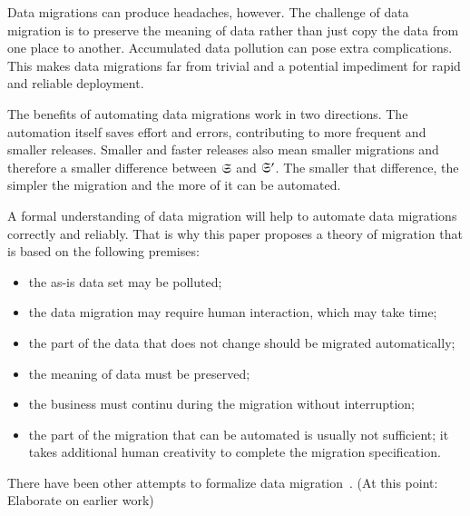 \documentclass{elsarticle}
\begin{document}
	Data migrations can produce headaches, however.
	The challenge of data migration is to preserve the meaning of data
	rather than just copy the data from one place to another.
	Accumulated data pollution can pose extra complications.
	This makes data migrations far from trivial and a potential impediment for rapid and reliable deployment.

	The benefits of automating data migrations work in two directions.
	The automation itself saves effort and errors,
	contributing to more frequent and smaller releases.
	Smaller and faster releases also mean smaller migrations
	and therefore a smaller difference between $\mathfrak{S}$ and $\mathfrak{S}'$.
	The smaller that difference, the simpler the migration and the more of it can be automated.

	A formal understanding of data migration will help to automate data migrations correctly and reliably.
	That is why this paper proposes a theory of migration that is based on the
	following premises:
\begin{itemize}
	\item the as-is data set may be polluted;
	\item the data migration may require human interaction, which may take time;
	\item the part of the data that does not change should be migrated automatically;
	\item the meaning of data must be preserved;
	\item the business must continu during the migration without interruption;
	\item the part of the migration that can be automated is usually not sufficient;
	      it takes additional human creativity to complete the migration specification.
\end{itemize}

	There have been other attempts to formalize data migration~\cite{Thalheim2013}.
	(At this point: Elaborate on earlier work)
\end{document}
